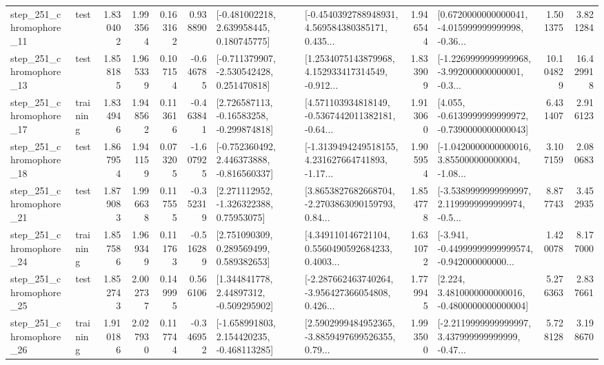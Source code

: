 \begin{tabular}{llrrrrllrlrr}
  step\_251\_chromophore\_11 &      test &      1.830402 &    1.993564 &      0.163162 &  0.938890 &    [-0.481002218, 2.639958445, 0.180745775] &  [-0.4540392788948931, 4.569584380385171, 0.435... &       1.946544 &  [0.6720000000000041, -4.015999999999998, -0.36... &            1.501375 &          3.821284 \\
  step\_251\_chromophore\_13 &      test &      1.858185 &    1.965339 &      0.107154 & -0.646785 &   [-0.711379907, -2.530542428, 0.251470818] &  [1.2534075143879968, 4.152933417314549, -0.912... &       1.833909 &  [-1.2269999999999968, -3.992000000000001, -0.3... &           10.104829 &         16.429918 \\
  step\_251\_chromophore\_17 &  training &      1.834946 &    1.948562 &      0.113616 & -0.463841 &    [2.726587113, -0.16583258, -0.299874818] &  [4.571103934818149, -0.5367442011382181, -0.64... &       1.913060 &  [4.055, -0.6139999999999972, -0.7390000000000043] &            6.431407 &          2.916123 \\
  step\_251\_chromophore\_18 &      test &      1.867954 &    1.941159 &      0.073205 & -1.607925 &   [-0.752360492, 2.446373888, -0.816560337] &  [-1.3139494249518155, 4.231627664741893, -1.17... &       1.905954 &  [-1.0420000000000016, 3.855000000000004, -1.08... &            3.107159 &          2.080683 \\
  step\_251\_chromophore\_21 &      test &      1.879083 &    1.996638 &      0.117555 & -0.352319 &     [2.271112952, -1.326322388, 0.75953075] &  [3.8653827682668704, -2.2703863090159793, 0.84... &       1.854778 &  [-3.5389999999999997, 2.1199999999999974, -0.5... &            8.877743 &          3.452935 \\
  step\_251\_chromophore\_24 &  training &      1.857586 &    1.969349 &      0.111763 & -0.516289 &     [2.751090309, 0.289569499, 0.589382653] &  [4.349110146721104, 0.5560490592684233, 0.4003... &       1.631072 &  [-3.941, -0.44999999999999574, -0.942000000000... &            1.420078 &          8.177000 \\
  step\_251\_chromophore\_25 &      test &      1.852743 &    2.002737 &      0.149995 &  0.566106 &     [1.344841778, 2.44897312, -0.509295902] &  [-2.287662463740264, -3.956427366054808, 0.426... &       1.779945 &   [2.224, 3.4810000000000016, -0.4800000000000004] &            5.276363 &          2.837661 \\
  step\_251\_chromophore\_26 &  training &      1.910186 &    2.027930 &      0.117744 & -0.346952 &   [-1.658991803, 2.154420235, -0.468113285] &  [2.5902999484952365, -3.8859497699526355, 0.79... &       1.993500 &  [-2.2119999999999997, 3.437999999999999, -0.47... &            5.728128 &          3.198670 \\

\end{tabular}
